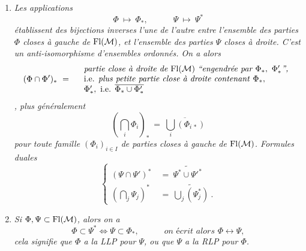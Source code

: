 \begin{enumerate}[label={}]
\item[c)] \textit{Les applications}
\[
\Phi \ \longmapsto\ \Phi_*, \qquad\quad \Psi\ \longmapsto\ \Psi^*
\]
\textit{établissent des bijections inverses l'une de l'autre entre l'ensemble des parties $\Phi$ closes à gauche de} $\mathrm{Fl}(\mathcal{M})$\textit{, et l'ensemble des parties $\Psi$ closes à droite. C'est un anti-isomorphisme d'ensembles ordonnés. On a alors}
\[
(\Phi \cap \Phi')_* \ = \quad
\begin{array}{l}
\textit{partie close à droite de } \mathrm{Fl}(\mathcal{M}) \ \textit{``engendrée par } \Phi_*,\ \Phi'_*\textit{'',} \\
\text{i.e. \textit{plus petite partie close à droite contenant} } \Phi_*, \\
\Phi'_*, \text{ i.e. } \overline{\Phi_* \cup \Phi'_*}
\end{array}
\]
\textit{, plus généralement}
\[
(\bigcap_i \Phi_i)_* \ = \ \overline{\bigcup_i (\Phi_{i\,*})}
\]
\textit{pour toute famille $(\Phi_i)_{i \in I}$ de parties closes à gauche de} $\mathrm{Fl}(\mathcal{M})$\textit{. Formules duales}
\[
\left\{
\begin{aligned}
(\Psi \cap \Psi')^* \ &= \ \widetilde{\Psi^* \cup \Psi'^*} \\
(\bigcap_j \Psi_j)^* \ &= \ \widetilde{\bigcup_j (\Psi_j^*)}\ .
\end{aligned}
\right.
\]

\item[d)] \textit{Si} $\Phi, \Psi \subset \mathrm{Fl}(\mathcal{M})$\textit{, alors on a}
\[
\Phi \subset \Psi^* \iff \Psi \subset \Phi_*, \qquad\quad \textit{on écrit alors } \Phi \longleftrightarrow \Psi,
\]
\textit{cela signifie que $\Phi$ a la LLP pour $\Psi$, ou que $\Psi$ a la RLP pour $\Phi$.}
\end{enumerate}



